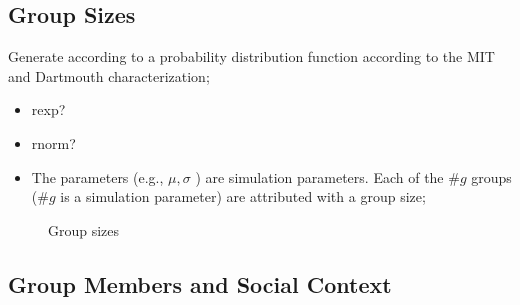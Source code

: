 \documentclass[10pt, conference, letterpaper]{IEEEtran}
\begin{document}
\subsection{Group Sizes}

Generate according to a probability distribution function according to the MIT and Dartmouth characterization;

\begin{itemize}
    \item rexp?
    \item rnorm?
    \item The parameters (e.g., $\mu, \sigma$ ) are simulation parameters. Each of the $\#g$ groups ($\#g$ is a simulation parameter) are attributed with a group size;
\end{itemize}

\begin{figure}[!t]
\centering
\caption{Group sizes}\label{comm}
\end{figure}

\subsection{Group Members and Social Context}
\end{document}

